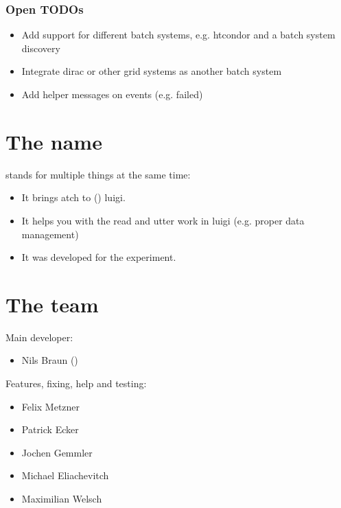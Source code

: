 \documentclass[letterpaper,10pt,english]{sphinxmanual}
\begin{document}
\subsection{Open TODOs}
\label{\detokenize{advanced/development:open-todos}}\begin{itemize}
\item {} 
Add support for different batch systems, e.g. htcondor and a batch system discovery

\item {} 
Integrate dirac or other grid systems as another batch system

\item {} 
Add helper messages on events (e.g. failed)

\end{itemize}


\chapter{The name}
\label{\detokenize{index:the-name}}
 stands for multiple things at the same time:
\begin{itemize}
\item {} 
It brings atch to () luigi.

\item {} 
It helps you with the read and utter work in luigi (e.g. proper data management)

\item {} 
It was developed for the  experiment.

\end{itemize}


\chapter{The team}
\label{\detokenize{index:the-team}}
Main developer:
\begin{itemize}
\item {} 
Nils Braun ()

\end{itemize}

Features, fixing, help and testing:
\begin{itemize}
\item {} 
Felix Metzner

\item {} 
Patrick Ecker

\item {} 
Jochen Gemmler

\item {} 
Michael Eliachevitch

\item {} 
Maximilian Welsch

\end{itemize}
\end{document}
